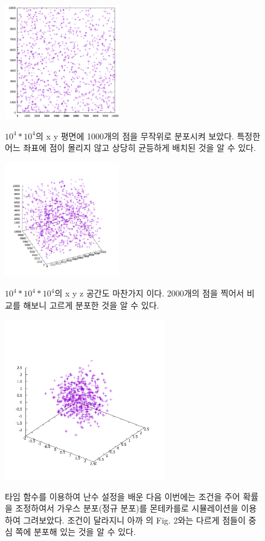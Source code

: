 \documentclass{gshs-report-v1.2}
\begin{document}
\begin{figure}[h]
	\begin{center}
		\includegraphics[width=5cm]{xy_simul2_1000.png}\\
		\caption{$10^4*10^4$의 x y 평면에 1000개의 점을 무작위로 분포시켜 보았다. 특정한 어느 좌표에 점이 몰리지 않고 상당히 균등하게 배치된 것을 알 수 있다.}
		
		\label{Fig01}
	\end{center}
\end{figure}
\begin{figure}[h]
	\begin{center}
		\includegraphics[width=5cm]{xyz_simul.png}\\
		\caption{$10^4*10^4*10^4$의 x y z 공간도 마찬가지 이다. 2000개의 점을 찍어서 비교를 해보니 고르게 분포한 것을 알 수 있다.} 
		\label{Fig02}
	\end{center}
\end{figure}
\begin{figure}[t]
	\begin{center}
		\includegraphics[width=7cm]{gaussian_distribution.png}\\
		\caption{타임 함수를 이용하여 난수 설정을 배운 다음 이번에는 조건을 주어 확률을 조정하여서 가우스 분포(정규 분포)를 몬테카를로 시뮬레이션을 이용하여 그려보았다. 조건이 달라지니 아까 의 Fig. 2와는 다르게 점들이 중심 쪽에 분포해 있는 것을 알 수 있다.} 
		\label{Fig03}
	\end{center}
\end{figure}
\end{document}
